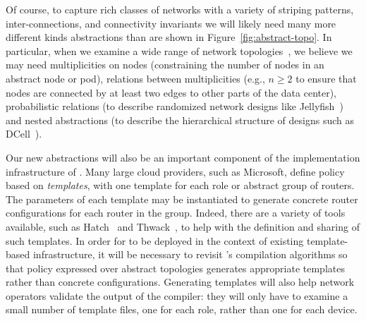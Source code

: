 Of course, to capture rich classes of networks with a variety of
striping patterns, inter-connections, and connectivity
invariants
we will likely need many more different kinds abstractions than are
shown in Figure~\ref{fig:abstract-topo}.  In particular, when we examine a wide range of network
topologies~\cite{al-fares:data-center-architecture,f10,quasi-fat-trees,aspen-trees,jellyfish,dcell}, 
we believe we may need multiplicities on nodes (constraining the
number of nodes in an abstract node or pod), relations between 
multiplicities (e.g., $n \geq 2$
to ensure that nodes are connected by at least two edges to other parts of the data center), probabilistic relations (to describe randomized network
designs like Jellyfish~\cite{jellyfish}) and nested abstractions (to describe the
hierarchical structure of designs such as DCell~\cite{dcell}).  

Our new abstractions will also be an important component of the implementation
infrastructure of \Name. 
Many large cloud providers, such as Microsoft, define policy based on
\emph{templates}, with one template for each role or abstract group of
routers.  The parameters of each template may be instantiated to generate
concrete router configurations for each router in the group.
Indeed, there are a variety of tools available, such as Hatch~\cite{hatch}
and Thwack~\cite{thwack},
to help with the definition and sharing of such templates.
In order for \Name to be deployed in the context of existing template-based infrastructure,
it will be necessary to revisit \Propane's compilation algorithms so
that policy expressed over abstract topologies generates appropriate
templates rather than concrete configurations.  Generating templates will
also help network operators validate the output of the \Name compiler:
they will only have to examine a small number of template files, one for
each role, rather than one for each device.

